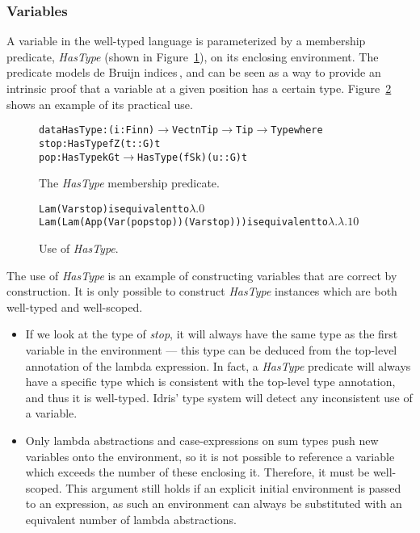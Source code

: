 \subsubsection{Variables}

A variable in the well-typed language is parameterized by a membership predicate, \textit{HasType} (shown in Figure~\ref{fig:HasType}), on its enclosing environment. The predicate models de Bruijn indices\,\cite{Bruijn72lambdacalculus}, and can be seen as a way to provide an intrinsic proof that a variable at a given position has a certain type. Figure~\ref{fig:HasType-use} shows an example of its practical use.

\begin{figure}
\begin{alltt}
  data HasType : (i : Fin n) \(\rightarrow\) Vect n Tip \(\rightarrow\) Tip \(\rightarrow\) Type where
    stop : HasType fZ (t :: G) t
    pop  : HasType k G t \(\rightarrow\) HasType (fS k) (u :: G) t
\end{alltt}
\caption{The \textit{HasType} membership predicate.}
\label{fig:HasType}
\end{figure}

\begin{figure}
\begin{alltt}
  Lam (Var stop)                              is equivalent to \(\lambda.0\)
  Lam (Lam (App (Var (pop stop)) (Var stop))) is equivalent to \(\lambda.\lambda.1 0\)
\end{alltt}
\caption{Use of \textit{HasType}.}
\label{fig:HasType-use}
\end{figure}

The use of \textit{HasType} is an example of constructing variables that are correct by construction. It is only possible to construct \textit{HasType} instances which are both well-typed and well-scoped.
\begin{itemize}
\item If we look at the type of \textit{stop}, it will always have the same type as the first variable in the environment --- this type can be deduced from the top-level annotation of the lambda expression. In fact, a \textit{HasType} predicate will always have a specific type which is consistent with the top-level type annotation, and thus it is well-typed. Idris' type system will detect any inconsistent use of a variable. 
\item Only lambda abstractions and case-expressions on sum types push new variables onto the environment, so it is not possible to reference a variable which exceeds the number of these enclosing it. Therefore, it must be well-scoped. This argument still holds if an explicit initial environment is passed to an expression, as such an environment can always be substituted with an equivalent number of lambda abstractions.
\end{itemize}

